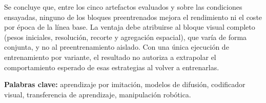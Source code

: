 Se concluye que, entre los cinco artefactos evaluados y sobre las condiciones ensayadas,
ninguno de los bloques preentrenados mejora el rendimiento ni el coste por \'epoca de la
l\'inea base. La ventaja debe atribuirse al bloque visual completo (pesos iniciales,
resoluci\'on, recorte y agregaci\'on espacial), que var\'ia de forma conjunta, y no al
preentrenamiento aislado. Con una \'unica ejecuci\'on de entrenamiento por variante, el
resultado no autoriza a extrapolar el comportamiento esperado de esas estrategias al volver
a entrenarlas.

\vspace{0.6em}
\noindent\textbf{Palabras clave:} aprendizaje por imitaci\'on, modelos de difusi\'on,
codificador visual, transferencia de aprendizaje, manipulaci\'on rob\'otica.
